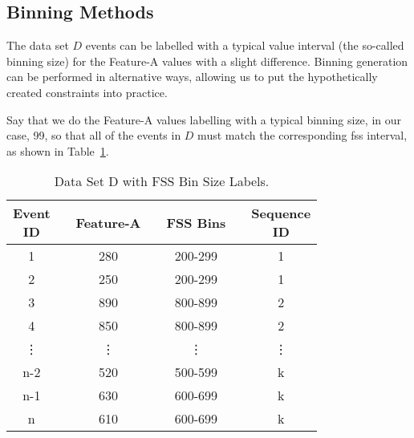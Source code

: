 \subsection{Binning Methods}

The data set $D$ events can be labelled with a typical value interval (the so-called binning size) for the Feature-A values with a slight difference. Binning generation can be performed in alternative ways, allowing us to put the hypothetically created constraints into practice.

Say that we do the Feature-A values labelling with a typical binning size, in our case, 99, so that all of the events in $D$ must match the corresponding \ac{fss} interval, as shown in Table~\ref{Tab: D-dataset-FSS}. 
\begin{table}[ht!]
	\centering
	\setlength{\arrayrulewidth}{0.79pt}%
	\caption{Data Set D with FSS Bin Size Labels.} 
	\begin{tabular}{|cc|c|ccc|c|}
		\hline \rowcolor[HTML]{FFFFC7}
		\makecell{Event\\ID} 	&& Feature-A    	&& FSS Bins && \makecell{Sequence\\ID}  \\ \hline
		1 	      && 280	    && 200-299	&& 1 		     \\
		2 		  && 250	    && 200-299	&& 1 		     \\
		3 	      && 890	    && 800-899	&& 2 		     \\
		4 		  && 850	    && 800-899	&& 2 		     \\
		\vdots	  && \vdots  	&& \vdots	&& \vdots 	     \\
		n-2 	  && 520	    && 500-599	&& k 		     \\
		n-1       && 630	    && 600-699	&& k 		     \\
		n 		  && 610	    && 600-699	&& k 		     \\ \hline
	\end{tabular}
	\label{Tab: D-dataset-FSS}
\end{table}


